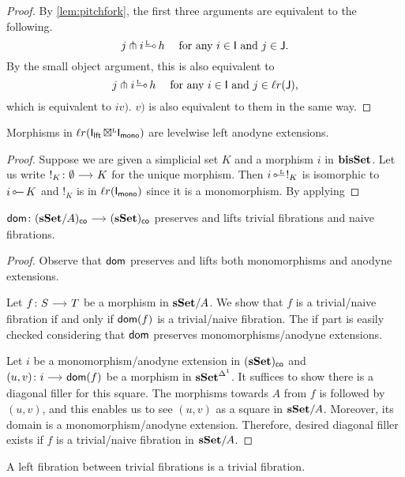 \documentclass[a4paper,  dvipsnames, 11pt]{amsart}
\begin{document}
\begin{proof}
	By \cref{lem:pitchfork}, the first three arguments are equivalent to the following.
	\[
		j \pitchfork i\rollipopL h
		\hspace{3ex}
		\text{for any $i\in\I$ and $j\in\J$.}
	\]
	By the small object argument,
	this is also equivalent to
	\[
		j \pitchfork i\rollipopL h
		\hspace{3ex}
		\text{for any $i\in\I$ and $j\in\ell r(\J)$,}
	\]
	which is equivalent to $iv)$.
	$v)$ is also equivalent to them in the same way.
\end{proof}
\begin{corollary}
	Morphisms in $\ell r(\mathsf{I}_{\mathsf{lft}}{\mathrel{\,\boxtimes^{\text{\tiny{L}}}}}\mathsf{I}_{\mathsf{mono}})$ are levelwise left anodyne extensions.
\end{corollary}
\begin{proof}
	Suppose we are given a simplicial set $K$ and a morphism $i$ in $\mathbf{bisSet}$.
	Let us write $!_K\colon\emptyset\arr K$ for the unique morphism.
	Then $i\lollipopL !_K$ is isomorphic to $i\lollipop K$ and $!_K$ is in $\ell r(\mathsf{I}_{\mathsf{mono}})$ since it is a monomorphism.
	By applying 
\end{proof}
\begin{lemma}
	$\dom\colon(\sSet/A)_\co\arr(\sSet)_\co$ preserves and lifts trivial fibrations and naive fibrations.
\end{lemma}
\begin{proof}
	Observe that $\mathsf{dom}$ preserves and lifts both monomorphisms and anodyne extensions.

	Let $f\colon S\arr T$ be a morphism in $\mathbf{sSet}/A$. We show that $f$ is a trivial/naive fibration if and only if $\mathsf{dom}(f)$ is a trivial/naive fibration.
	The if part is easily checked considering that $\mathsf{dom}$ preserves monomorphisms/anodyne extensions.

	Let $i$ be a monomorphism/anodyne extension in $(\mathbf{sSet})_{\mathsf{co}}$ and $(u,v)\colon i \arr \dom(f)$ be a morphism in $\mathbf{sSet}^{\Delta^1}$.
	It suffices to show there is a diagonal filler for this square. 
	The morphisms towards $A$ from $f$ is followed by $(u,v)$, and this enables us to see $(u,v)$ as a
	square in $\mathbf{sSet}/A$. Moreover, its domain is a monomorphism/anodyne extension.
	Therefore, desired diagonal filler exists if $f$ is a trivial/naive fibration in $\mathbf{sSet}/A$.
\end{proof}
\begin{lemma}
	A left fibration between trivial fibrations is a trivial fibration.
\end{lemma}
\end{document}
